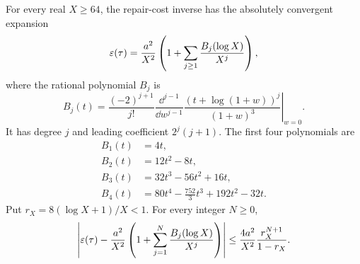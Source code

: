 \begin{theorem}
\label{thm:convergent-inverse}
For every real \(X\ge64\), the repair-cost inverse has the absolutely
convergent expansion
\begin{equation}
 \varepsilon(\tau)=\frac{a^2}{X^2}
 \left(1+\sum_{j\ge1}\frac{B_j(\log X)}{X^j}\right),
 \label{eq:convergent-inverse}
\end{equation}
where the rational polynomial \(B_j\) is
\begin{equation}
 B_j(t)=\frac{(-2)^{j+1}}{j!}
 \left.\frac{\dd^{j-1}}{\dd w^{j-1}}
    \frac{(t+\log(1+w))^j}{(1+w)^3}\right|_{w=0}.
 \label{eq:inverse-coefficients}
\end{equation}
It has degree \(j\) and leading coefficient \(2^j(j+1)\). The
first four polynomials are
\begin{align*}
 B_1(t)&=4t,\\
 B_2(t)&=12t^2-8t,\\
 B_3(t)&=32t^3-56t^2+16t,\\
 B_4(t)&=80t^4-\frac{752}{3}t^3+192t^2-32t.
\end{align*}
Put \(r_X=8(\log X+1)/X<1\). For every integer \(N\ge0\),
\begin{equation}
 \left|\varepsilon(\tau)-\frac{a^2}{X^2}
  \left(1+\sum_{j=1}^{N}\frac{B_j(\log X)}{X^j}\right)\right|
 \le\frac{4a^2}{X^2}\frac{r_X^{N+1}}{1-r_X}.
 \label{eq:inverse-remainder}
\end{equation}
\end{theorem}
